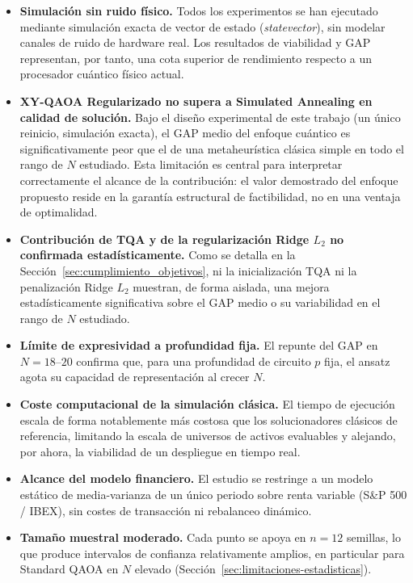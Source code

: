 \begin{itemize}
    \item \textbf{Simulación sin ruido físico.} Todos los experimentos se han ejecutado mediante simulación exacta
    de vector de estado (\emph{statevector}), sin modelar canales de ruido de hardware real. Los resultados de
    viabilidad y GAP representan, por tanto, una cota superior de rendimiento respecto a un procesador cuántico
    físico actual.
    \item \textbf{XY-QAOA Regularizado no supera a Simulated Annealing en calidad de solución.} Bajo el diseño
    experimental de este trabajo (un único reinicio, simulación exacta), el GAP medio del enfoque cuántico es
    significativamente peor que el de una metaheurística clásica simple en todo el rango de $N$ estudiado. Esta
    limitación es central para interpretar correctamente el alcance de la contribución: el valor demostrado del
    enfoque propuesto reside en la garantía estructural de factibilidad, no en una ventaja de optimalidad.
    \item \textbf{Contribución de TQA y de la regularización Ridge $L_2$ no confirmada estadísticamente.} Como se
    detalla en la Sección~\ref{sec:cumplimiento_objetivos}, ni la inicialización TQA ni la penalización Ridge
    $L_2$ muestran, de forma aislada, una mejora estadísticamente significativa sobre el GAP medio o su
    variabilidad en el rango de $N$ estudiado.
    \item \textbf{Límite de expresividad a profundidad fija.} El repunte del GAP en $N=18$--$20$ confirma que,
    para una profundidad de circuito $p$ fija, el ansatz agota su capacidad de representación al crecer $N$.
    \item \textbf{Coste computacional de la simulación clásica.} El tiempo de ejecución escala de forma
    notablemente más costosa que los solucionadores clásicos de referencia, limitando la escala de universos de
    activos evaluables y alejando, por ahora, la viabilidad de un despliegue en tiempo real.
    \item \textbf{Alcance del modelo financiero.} El estudio se restringe a un modelo estático de media-varianza
    de un único periodo sobre renta variable (S\&P 500 / IBEX), sin costes de transacción ni rebalanceo dinámico.
    \item \textbf{Tamaño muestral moderado.} Cada punto se apoya en $n=12$ semillas, lo que produce intervalos de
    confianza relativamente amplios, en particular para Standard QAOA en $N$ elevado (Sección~\ref{sec:limitaciones-estadisticas}).
\end{itemize}

